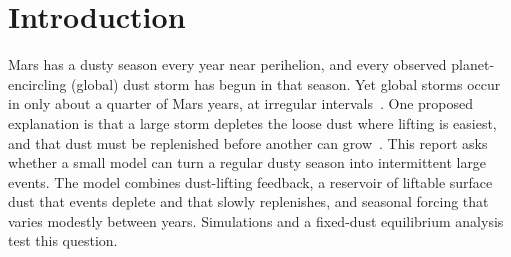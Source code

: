 \section{Introduction}
\label{sec:introduction}

Mars has a dusty season every year near perihelion, and every observed planet-encircling (global) dust storm has begun in that season. Yet global storms occur in only about a quarter of Mars years, at irregular intervals~\cite{smith2019}. One proposed explanation is that a large storm depletes the loose dust where lifting is easiest, and that dust must be replenished before another can grow~\cite{smith2019,mulholland2013}. This report asks whether a small model can turn a regular dusty season into intermittent large events. The model combines dust-lifting feedback, a reservoir of liftable surface dust that events deplete and that slowly replenishes, and seasonal forcing that varies modestly between years. Simulations and a fixed-dust equilibrium analysis test this question.
